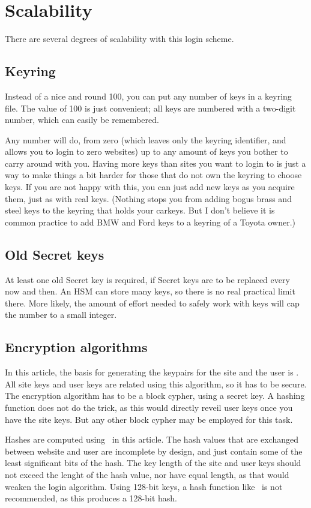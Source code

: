 \section{Scalability}
There are several degrees of scalability with this login scheme.

\subsection{Keyring}
Instead of a nice and round 100,
you can put any number of keys in a keyring file.
The value of 100 is just convenient;
all keys are numbered with a two-digit number,
which can easily be remembered.
\par
Any number will do,
from zero
(which leaves only the keyring identifier,
and allows you to login to zero websites)
up to any amount of keys you bother to carry around with you.
Having more keys than sites you want to login to is just a way to make things a bit harder for those that do not own the keyring to choose keys.
If you are not happy with this,
you can just add new keys as you acquire them,
just as with real keys.
(Nothing stops you from adding bogus brass and steel keys to the keyring that holds your carkeys.
But I don't believe it is common practice to add BMW and Ford keys to a keyring of a Toyota owner.)

\subsection{Old Secret keys}
At least one old Secret key is required,
if Secret keys are to be replaced every now and then.
An HSM can store many keys,
so there is no real practical limit there.
More likely,
the amount of effort needed to safely work with keys will cap the number to a small integer.

\subsection{Encryption algorithms}
In this article,
the basis for generating the keypairs for the site and the user is \AES.
All site keys and user keys are related using this algorithm,
so it has to be secure.
The encryption algorithm has to be a block cypher,
using a secret key.
A hashing function does not do the trick,
as this would directly reveil user keys once you have the site keys.
But any other block cypher may be employed for this task.
\par
Hashes are computed using \SHA\ in this article.
The hash values that are exchanged between website and user are incomplete by design,
and just contain some of the least significant bits of the hash.
The key length of the site and user keys
should not exceed the lenght of the hash value,
nor have equal length,
as that would weaken the login algorithm.
Using 128-bit keys, a hash function like \MDV\ is not recommended, as this produces a 128-bit hash.
